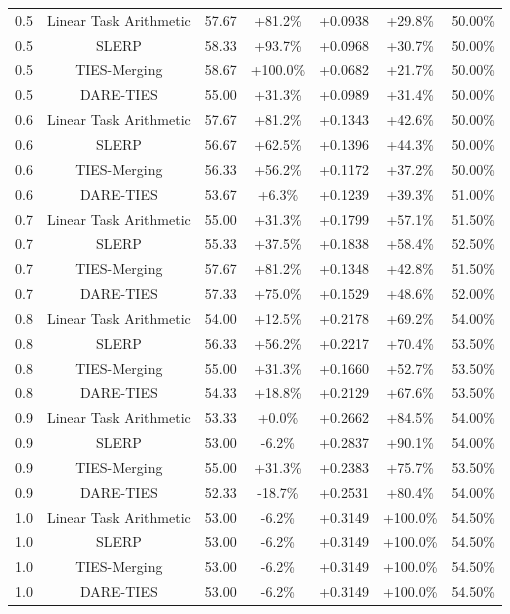 \begin{table}[t]
\begin{tabular}{ccccccc}
0.5 & Linear Task Arithmetic & 57.67 & +81.2\% & +0.0938 & +29.8\% & 50.00\% \\
0.5 & SLERP & 58.33 & +93.7\% & +0.0968 & +30.7\% & 50.00\% \\
0.5 & TIES-Merging & 58.67 & +100.0\% & +0.0682 & +21.7\% & 50.00\% \\
0.5 & DARE-TIES & 55.00 & +31.3\% & +0.0989 & +31.4\% & 50.00\% \\
0.6 & Linear Task Arithmetic & 57.67 & +81.2\% & +0.1343 & +42.6\% & 50.00\% \\
0.6 & SLERP & 56.67 & +62.5\% & +0.1396 & +44.3\% & 50.00\% \\
0.6 & TIES-Merging & 56.33 & +56.2\% & +0.1172 & +37.2\% & 50.00\% \\
0.6 & DARE-TIES & 53.67 & +6.3\% & +0.1239 & +39.3\% & 51.00\% \\
0.7 & Linear Task Arithmetic & 55.00 & +31.3\% & +0.1799 & +57.1\% & 51.50\% \\
0.7 & SLERP & 55.33 & +37.5\% & +0.1838 & +58.4\% & 52.50\% \\
0.7 & TIES-Merging & 57.67 & +81.2\% & +0.1348 & +42.8\% & 51.50\% \\
0.7 & DARE-TIES & 57.33 & +75.0\% & +0.1529 & +48.6\% & 52.00\% \\
0.8 & Linear Task Arithmetic & 54.00 & +12.5\% & +0.2178 & +69.2\% & 54.00\% \\
0.8 & SLERP & 56.33 & +56.2\% & +0.2217 & +70.4\% & 53.50\% \\
0.8 & TIES-Merging & 55.00 & +31.3\% & +0.1660 & +52.7\% & 53.50\% \\
0.8 & DARE-TIES & 54.33 & +18.8\% & +0.2129 & +67.6\% & 53.50\% \\
0.9 & Linear Task Arithmetic & 53.33 & +0.0\% & +0.2662 & +84.5\% & 54.00\% \\
0.9 & SLERP & 53.00 & -6.2\% & +0.2837 & +90.1\% & 54.00\% \\
0.9 & TIES-Merging & 55.00 & +31.3\% & +0.2383 & +75.7\% & 53.50\% \\
0.9 & DARE-TIES & 52.33 & -18.7\% & +0.2531 & +80.4\% & 54.00\% \\
1.0 & Linear Task Arithmetic & 53.00 & -6.2\% & +0.3149 & +100.0\% & 54.50\% \\
1.0 & SLERP & 53.00 & -6.2\% & +0.3149 & +100.0\% & 54.50\% \\
1.0 & TIES-Merging & 53.00 & -6.2\% & +0.3149 & +100.0\% & 54.50\% \\
1.0 & DARE-TIES & 53.00 & -6.2\% & +0.3149 & +100.0\% & 54.50\% \\
\bottomrule
\end{tabular}
\end{table}
